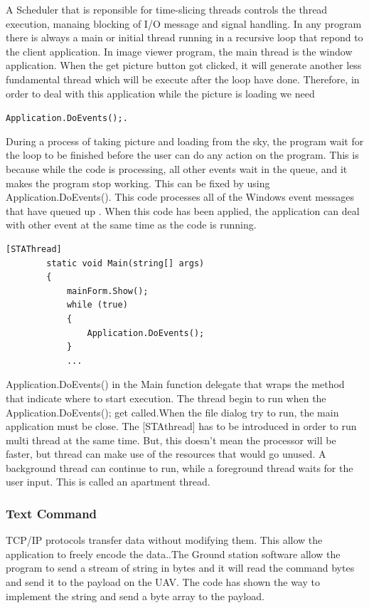 \documentclass[oneside]{ecsgdp}         %
\begin{document}
A Scheduler that is reponsible for time-slicing threads controls the thread execution, manaing blocking of I/O message and signal handling\cite{keithC}. In any program there is always a main or initial thread running in a recursive loop that repond to the client application. In image viewer program, the main thread is the window application. When the get picture button got clicked, it will generate another less fundamental thread which will be execute after the loop have done. Therefore, in order to deal with this application while the picture is loading we need

\begin{center}
\texttt{Application.DoEvents();.}
\end{center}

During a process of taking picture and loading from the sky, the program wait for the loop to be finished before the user can do any action on the program. This is because while the code is processing, all other events wait in the queue, and it makes the program stop working. This can be fixed by using Application.DoEvents(). This code processes all of the Windows event messages that have queued up \cite{davidW}. When this code has been applied, the application can deal with other event at the same time as the code is running.


\begin{lstlisting}[caption={thread handling in the main},label=lst:threadH]
        [STAThread]        
        static void Main(string[] args)        
        {        
            mainForm.Show();
            while (true)            
            {            
                Application.DoEvents();                
            }
        	...
        \end{lstlisting}
        Application.DoEvents() in the Main function delegate that wraps the method that indicate where to start execution. The thread begin to run when the Application.DoEvents(); get called\cite{xieX}.When the file dialog try to run, the main application must be close. The [STAthread] has to be introduced in order to run multi thread at the same time. But, this doesn't mean the processor will be faster, but thread can make use of the resources that would go unused. A background thread can continue to run, while a foreground thread waits for the user input. This is called an apartment thread. 
        
\subsubsection*{Text Command}
TCP/IP protocols transfer data without modifying them. This allow the application to freely encode the data.\cite{davidB}.The Ground station software allow the program to send a stream of string in bytes and it will read the command bytes and send it to the payload on the UAV. The code has shown the way to implement the string and send a byte array to the payload.
	
\end{document}
